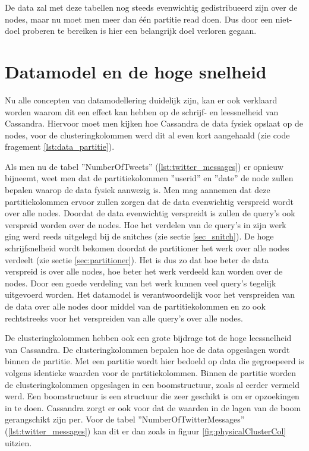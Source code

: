 De data zal met deze tabellen nog steeds evenwichtig gedistribueerd zijn over de nodes, maar nu moet men meer dan één partitie read doen.
Dus door een niet-doel proberen te bereiken is hier een belangrijk doel verloren gegaan.

\section{Datamodel en de hoge snelheid}
\label{sec:highthroughput}
Nu alle concepten van datamodellering duidelijk zijn, kan er ook verklaard worden waarom dit een effect kan hebben op de schrijf- en leessnelheid van Cassandra.
Hiervoor moet men kijken hoe Cassandra de data fysiek opslaat op de nodes, voor de clusteringkolommen werd dit al even kort aangehaald (zie code fragement \ref{lst:data_partitie}).

Als men nu de tabel ''NumberOfTweets'' (\ref{lst:twitter_messages}) er opnieuw bijneemt, weet men dat de partitiekolommen ''userid'' en ''date'' de node zullen bepalen waarop de data fysiek aanwezig is.
Men mag aannemen dat deze partitiekolommen ervoor zullen zorgen dat de data evenwichtig verspreid wordt over alle nodes.
Doordat de data evenwichtig verspreidt is zullen de query's ook verspreid worden over de nodes.
Hoe het verdelen van de query's in zijn werk ging werd reeds uitgelegd bij de snitches (zie sectie \ref{sec_snitch}).
De hoge schrijfsnelheid wordt bekomen doordat de partitioner het werk over alle nodes verdeelt (zie sectie \ref{sec:partitioner}).
Het is dus zo dat hoe beter de data verspreid is over alle nodes, hoe beter het werk verdeeld kan worden over de nodes.
Door een goede verdeling van het werk kunnen veel query's tegelijk uitgevoerd worden.
Het datamodel is verantwoordelijk voor het verspreiden van de data over alle nodes door middel van de partitiekolommen en zo ook rechtstreeks voor het verspreiden van alle query's over alle nodes.

De clusteringkolommen hebben ook een grote bijdrage tot de hoge leessnelheid van Cassandra.
De clusteringkolommen bepalen hoe de data opgeslagen wordt binnen de partitie.
Met een partitie wordt hier bedoeld op data die gegroepeerd is volgens identieke waarden voor de partitiekolommen.
Binnen de partitie worden de clusteringkolommen opgeslagen in een boomstructuur, zoals al eerder vermeld werd.
Een boomstructuur is een structuur die zeer geschikt is om er opzoekingen in te doen.
Cassandra zorgt er ook voor dat de waarden in de lagen van de boom gerangschikt zijn per.
Voor de tabel ''NumberOfTwitterMessages'' (\ref{lst:twitter_messages}) kan dit er dan zoals in figuur \ref{fig:physicalClusterCol} uitzien.

